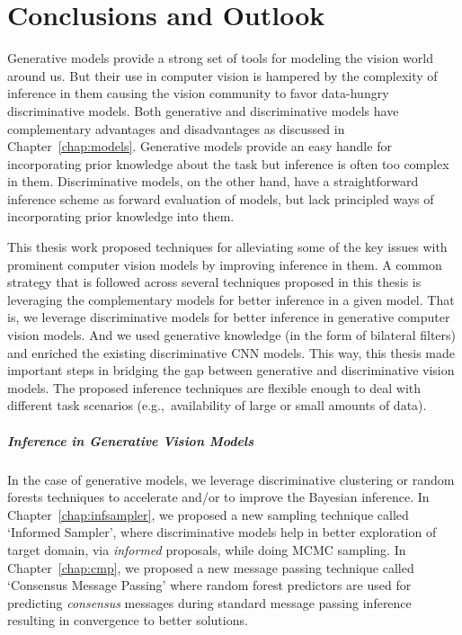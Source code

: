 \chapter{Conclusions and Outlook}
\label{chap:conclusion}

Generative models provide a strong set of tools for modeling the vision world
around us. But their use in computer vision is hampered by the complexity
of inference in them causing the vision community to favor data-hungry discriminative
models. Both generative and discriminative models have complementary advantages and
disadvantages as discussed in Chapter~\ref{chap:models}. Generative models provide
an easy handle for incorporating prior knowledge about the task but inference
is often too complex in them. Discriminative models, on the other hand, have
a straightforward inference scheme as forward evaluation of models, but lack
principled ways of incorporating prior knowledge into them.

This thesis work proposed techniques for alleviating some of the key issues
with prominent computer vision models by improving inference in them.
A common strategy that is followed across several techniques proposed in this
thesis is leveraging the complementary models for better inference in a given
model. That is, we leverage discriminative models for better inference in
generative computer vision models. And we used generative knowledge (in the form
of bilateral filters) and enriched the existing discriminative CNN models.
This way, this thesis made important steps in bridging the gap between
generative and discriminative vision models. The proposed inference techniques
are flexible enough to deal with different task scenarios (e.g.,\ availability
of large or small amounts of data).

\paragraph{Inference in Generative Vision Models} In the case of generative
models, we leverage discriminative clustering or random forests techniques
to accelerate and/or to improve the Bayesian inference. In Chapter~\ref{chap:infsampler},
we proposed a new sampling technique called `Informed Sampler', where discriminative models
help in better exploration of target domain, via \emph{informed} proposals,
while doing MCMC sampling. In Chapter~\ref{chap:cmp}, we proposed a new message passing technique called
`Consensus Message Passing' where random forest predictors are used for predicting
\emph{consensus} messages during standard message passing inference resulting in
convergence to better solutions.

